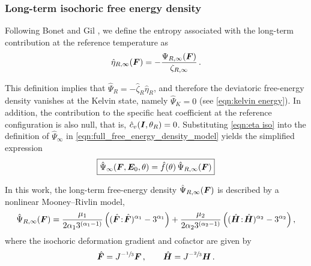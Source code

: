\subsubsection{Long-term isochoric free energy density} \label{sec:long term}


Following Bonet and Gil \cite{BonetGil2026}, we define the entropy associated with the long-term contribution at the reference temperature as
%
\begin{equation}\label{eqn:eta iso}
	\hat{\eta}_{R,\infty}(\boldsymbol{F})
	=
	-\frac{\Psi_{R,\infty}(\boldsymbol{F})}{\zeta_{R,\infty}} \, .
\end{equation}

This definition implies that $\hat{\Psi}_R = -\hat{\zeta}_R \hat{\eta}_R$, and therefore the deviatoric free-energy density vanishes at the Kelvin state, namely $\hat{\Psi}_K = 0$ (see \eqref{eqn:kelvin energy}). In addition, the contribution to the specific heat coefficient at the reference configuration is also null, that is,
$\hat{c}_v(\boldsymbol{I},\theta_R)=0$.
Substituting \eqref{eqn:eta iso} into the definition of $\hat{\Psi}_{\infty}$ in \eqref{eqn:full_free_energy_density_model} yields the simplified expression
%
\begin{equation*}\label{eqn:final hat psi infty}
	\boxed{
		\hat{\Psi}_{\infty}(\boldsymbol{F},\boldsymbol{E}_0,\theta)
		=
		\hat{f}(\theta)\,\hat{\Psi}_{R,\infty}(\boldsymbol{F})
	}
\end{equation*}

In this work, the long-term free-energy density $\hat{\Psi}_{R,\infty}(\boldsymbol{F})$ is described by a nonlinear Mooney--Rivlin model,
%
\begin{equation}
	\label{eqn:isochoric_mooney_rivlin}
	\hat\Psi_{R,\infty}(\boldsymbol{F}) =
	\frac{\mu_1}{2\alpha_1 3^{(\alpha_1-1)}}\left((\hat{\boldsymbol{F}}\!:\!\hat{\boldsymbol{F}})^{\alpha_1} - 3^{\alpha_1}\right) +
	\frac{\mu_2}{2\alpha_2 3^{(\alpha_2-1)}}\left((\hat{\boldsymbol{H}}\!:\!\hat{\boldsymbol{H}})^{\alpha_2} - 3^{\alpha_2}\right),
\end{equation}
where the isochoric deformation gradient and cofactor are given by
%
\begin{equation}
	\hat{\boldsymbol{F}} = J^{-\sfrac{1}{3}}\boldsymbol{F} \,,
	\qquad
	\hat{\boldsymbol{H}} = J^{-\sfrac{2}{3}}\boldsymbol{H} \,.
\end{equation}

